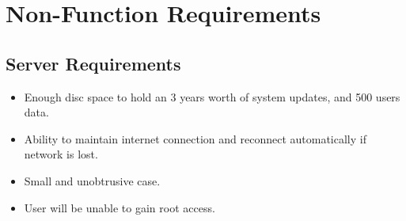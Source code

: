 \chapter{Non-Function Requirements}
{
    \renewcommand*{\theenumi}{\thesubsection.\arabic{enumi}}
    \renewcommand*{\theenumii}{\theenumi.\arabic{enumii}}
    \renewcommand*{\theenumiii}{\theenumii.\arabic{enumiii}}

    \section{Server Requirements}

        \begin{itemize}
            \item Enough disc space to hold an 3 years worth of system updates, 
            and 500 users data.
            \item Ability to maintain internet connection and reconnect 
            automatically if network is lost.
            \item Small and unobtrusive case.
            \item User will be unable to gain root access.
        \end{itemize}

}

